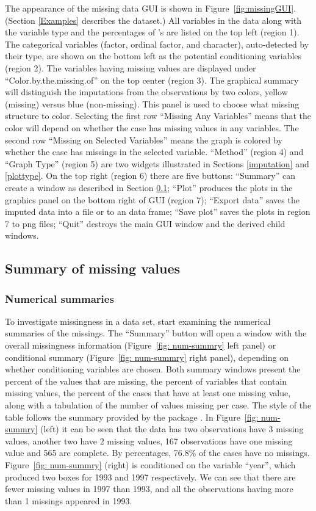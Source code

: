 \documentclass[article]{jss}
\begin{document}
The appearance of the missing data GUI is shown in Figure~\ref{fig:missingGUI}. (Section \ref{Examples} describes the dataset.) All variables in the data along with the variable type and the percentages of 's are listed on the top left (region 1). The categorical variables (factor, ordinal factor, and character), auto-detected by their type, are shown on the bottom left as the potential conditioning variables (region 2). The variables having missing values are displayed under ``Color.by.the.missing.of'' on the top center (region 3). The graphical summary will distinguish the imputations from the observations by two colors, yellow (missing) versus blue (non-missing). This panel is used to choose what missing structure to color. Selecting the first row ``Missing Any Variables'' means that the color will depend on whether the case has missing values in any variables. The second row ``Missing on Selected Variables'' means the graph is colored by whether the case has missings in the selected variable. ``Method'' (region 4) and ``Graph Type'' (region 5) are two widgets illustrated in Sections \ref{imputation} and \ref{plottype}. On the top right (region 6) there are five buttons: ``Summary'' can create a window as described in Section \ref{numsum}; ``Plot'' produces the plots in the graphics panel on the bottom right of GUI (region 7); ``Export data'' saves the imputed data into a file or to an  data frame; ``Save plot'' saves the plots in region 7 to png files; ``Quit'' destroys the main GUI window and the derived child windows.

\subsection{Summary of missing values}\label{numsum}

\subsubsection{Numerical summaries}
To investigate missingness in a data set, start examining the numerical summaries of the missings. The ``Summary'' button will open a window with the overall missingness information (Figure~\ref{fig: num-summry} left panel) or conditional summary (Figure~\ref{fig: num-summry} right panel), depending on whether conditioning variables are chosen. Both summary windows present the percent of the values that are missing, the percent of variables that contain missing values, the percent of the cases that have at least one missing value, along with a tabulation of the number of values missing per case. The style of the table follows the summary provided by the package .  In Figure~\ref{fig: num-summry} (left) it can be seen that the data has two observations have 3 missing values, another two have 2 missing values, 167 observations have one missing value and 565 are complete. By percentages, 76.8\% of the cases have no missings. Figure~\ref{fig: num-summry} (right) is conditioned on the variable ``year'', which produced two boxes for 1993 and 1997 respectively. We can see that there are fewer missing values in 1997 than 1993, and all the observations having more than 1 missings appeared in 1993.
\end{document}
